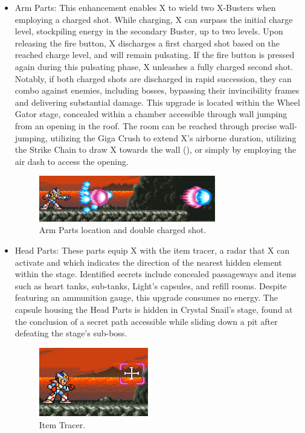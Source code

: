 \begin{itemize}
\item Arm Parts: This enhancement enables X to wield two X-Busters when employing a charged shot. While charging, X can surpass the initial charge level, stockpiling energy in the secondary Buster, up to two levels. Upon releasing the fire button, X discharges a first charged shot based on the reached charge level, and will remain pulsating. If the fire button is pressed again during this pulsating phase, X unleashes a fully charged second shot. Notably, if both charged shots are discharged in rapid succession, they can combo against enemies, including bosses, bypassing their invincibility frames and delivering substantial damage. This upgrade is located within the Wheel Gator stage, concealed within a chamber accessible through wall jumping from an opening in the roof. The room can be reached through precise wall-jumping, utilizing the Giga Crush to extend X's airborne duration, utilizing the Strike Chain to draw X towards the wall (), or simply by employing the air dash to access the opening.
	\begin{figure}[htp]
	\centering
	\includegraphics[height=2cm]{figures/X2/weapons/Double_shot.png}
	\caption{Arm Parts location  and double charged shot.}
\end{figure}
\item Head Parts: These parts equip X with the item tracer, a radar that X can activate and which indicates the direction of the nearest hidden element within the stage. Identified secrets include concealed passageways and items such as heart tanks, sub-tanks, Light's capsules, and refill rooms. Despite featuring an ammunition gauge, this upgrade consumes no energy. The capsule housing the Head Parts is hidden in Crystal Snail's stage, found at the conclusion of a secret path accessible while sliding down a pit after defeating the stage's sub-boss.
\begin{figure}[htp]
	\centering
	\includegraphics[height=3cm]{figures/X2/weapons/Tracer.png}
	\caption{Item Tracer.}
\end{figure}


\end{itemize}
